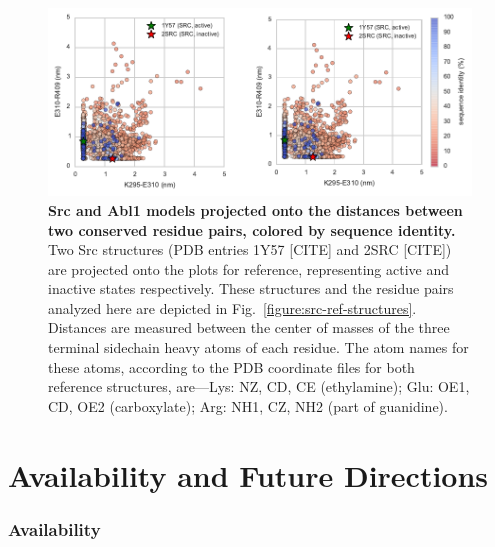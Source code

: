 \documentclass[aps,pre,twocolumn,nofootinbib,superscriptaddress,linenumbers]{revtex4-1}
\begin{document}
\begin{figure}

    \includegraphics[width=1.0\columnwidth]{residue_pair_distances/src_abl_combined/distances.pdf}

    \caption{{\bf Src and Abl1 models projected onto the distances between two conserved residue pairs, colored by sequence identity.}
    Two Src structures (PDB entries 1Y57 [CITE] and 2SRC [CITE]) are projected onto the plots for reference, representing active and inactive states respectively.
    These structures and the residue pairs analyzed here are depicted in Fig.~\ref{figure:src-ref-structures}.
    Distances are measured between the center of masses of the three terminal sidechain heavy atoms of each residue.
    The atom names for these atoms, according to the PDB coordinate files for both reference structures, are---Lys: NZ, CD, CE (ethylamine); Glu: OE1, CD, OE2 (carboxylate); Arg: NH1, CZ, NH2 (part of guanidine).
    }
  \label{figure:pair-distances}
\end{figure}

\section{Availability and Future Directions}
\label{section:availability}

\subsubsection*{Availability}
\end{document}

